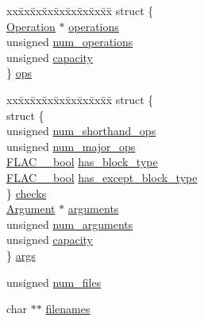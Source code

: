 \begin{DoxyCompactItemize}
\begin{tabbing}
xx\=xx\=xx\=xx\=xx\=xx\=xx\=xx\=xx\=\kill
struct \{\\
\>\hyperlink{struct_operation}{Operation} $\ast$ \hyperlink{struct_command_line_options_ac5c5d0ac5cf0a565cfc8a1e9a8ccd520}{operations}\\
\>unsigned \hyperlink{struct_command_line_options_a9260ad89111479f29fd3726343324d58}{num\_operations}\\
\>unsigned \hyperlink{struct_command_line_options_a50e3aed165186ba10f33bb6d6a341f82}{capacity}\\
\} \hyperlink{struct_command_line_options_a268967d250a5e89586eaf4902dd35ea4}{ops}\\

\end{tabbing}\item 
\begin{tabbing}
xx\=xx\=xx\=xx\=xx\=xx\=xx\=xx\=xx\=\kill
struct \{\\
\>struct \{\\
\>\>unsigned \hyperlink{struct_command_line_options_aa4e0d58629ffe5f1d4947c5622fea2da}{num\_shorthand\_ops}\\
\>\>unsigned \hyperlink{struct_command_line_options_a0b451b17ee21eac4af89c6f8b0ee6f6e}{num\_major\_ops}\\
\>\>\hyperlink{ordinals_8h_a95103469f1cbd78b8cf250194985b34e}{FLAC\_\_bool} \hyperlink{struct_command_line_options_a23896f20dd4c160aff71c58db40ce110}{has\_block\_type}\\
\>\>\hyperlink{ordinals_8h_a95103469f1cbd78b8cf250194985b34e}{FLAC\_\_bool} \hyperlink{struct_command_line_options_ae6a6ab20262e859a4335968e67adf6f7}{has\_except\_block\_type}\\
\>\} \hyperlink{struct_command_line_options_a1e36749dd9ea7ec7671d712460a915c5}{checks}\\
\>\hyperlink{struct_argument}{Argument} $\ast$ \hyperlink{struct_command_line_options_a48e1ce91f3a4589e96861fabb18e24c9}{arguments}\\
\>unsigned \hyperlink{struct_command_line_options_ac5b9fd0f965a9e2a786c23ee75984d5f}{num\_arguments}\\
\>unsigned \hyperlink{struct_command_line_options_a50e3aed165186ba10f33bb6d6a341f82}{capacity}\\
\} \hyperlink{struct_command_line_options_a794a001bfd238ab78ef40ec78de0f0be}{args}\\

\end{tabbing}\item 
unsigned \hyperlink{struct_command_line_options_aaefd053012280f5acc3195dec7e5823f}{num\+\_\+files}
\item 
char $\ast$$\ast$ \hyperlink{struct_command_line_options_acffa4e5aac605340ba7ce98d9d144562}{filenames}
\end{DoxyCompactItemize}


